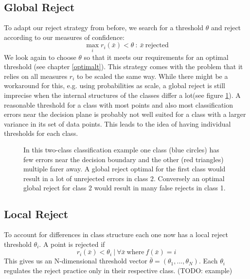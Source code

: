 \subsection{Global Reject}
To adapt our reject strategy from before, we search for a threshold $\theta$ and reject according to our measures of confidence:
$$ \operatorname*{max}_i r_i(\bar{x}) < \theta \ : \ \bar{x} \ \text{rejected}  $$
We look again to choose $\theta$ so that it meets our requirements for an optimal threshold (see chapter \ref{optimalt}). This strategy comes with the problem that it relies on all measures $r_i$ to be scaled the same way. While there might be a workaround for this, e.g. using probabilities as scale, a global reject is still imprecise when the internal structures of the classes differ a lot(see figure \ref{classStructure}). A reasonable threshold for a class with most points and also most classification errors near the decision plane is probably not well suited for a class with a larger variance in its set of data points. This leads to the idea of having individual thresholds for each class.

\begin{figure}[!htbp]
\centering
\caption{In this two-class classification example one class (blue circles) has few errors near the decision boundary and the other (red triangles) multiple farer away. A global reject optimal for the first class would result in a lot of unrejected errors in class 2. Conversely an optimal global reject for class 2 would result in many false rejects in class 1.}
\label{classStructure}
\end{figure}

\subsection{Local Reject}
To account for differences in class structure each one now has a local reject threshold $\theta_i$. A point is rejected if
$$ r_i(\bar{x}) < \theta_i \ | \ \forall \bar{x} \  \text{where} \ f(\bar{x}) = i $$
This gives us an N-dimensional threshold vector $\bar{\theta} = (\theta_1,...,\theta_N)$. Each $\theta_i$ regulates the reject practice only in their respective class. (TODO: example)

